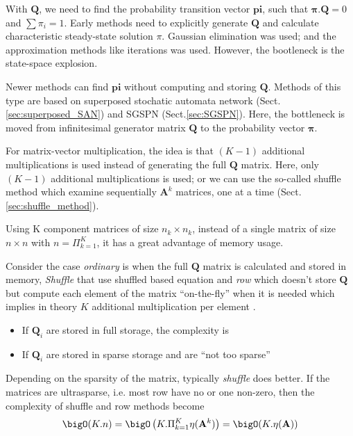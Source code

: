With $\mathbf{Q}$, we need to find the probability transition vector
$\mathbf{pi}$, such that $\mathbf{\pi.Q} = 0$ and $\sum \pi_i = 1$. Early
methods need to explicitly generate $\mathbf{Q}$ and calculate characteristic
steady-state solution $\pi$. Gaussian elimination was used; and the
approximation methods like iterations was used. However, the bootleneck is the
state-space explosion. 

Newer methods can find $\mathbf{pi}$ without computing and storing $\mathbf{Q}$.
Methods of this type are based on superposed stochatic automata network
(Sect.\ref{sec:superposed_SAN}) and SGSPN (Sect.\ref{sec:SGSPN}). Here, the
bottleneck is moved from infinitesimal generator matrix $\mathbf{Q}$ to the
probability vector $\mathbf{\pi}$. 

For matrix-vector multiplication, the idea is that $(K-1)$ additional
multiplications is used instead of generating the full $\mathbf{Q}$ matrix.
Here, only $(K-1)$ additional multiplications is used; or we can use the
so-called
    {shuffle method} which examine sequentially $\mathbf{A}^k$ matrices, one at
    a time \citep{davio1981} (Sect.\ref{sec:shuffle_method}). 

\begin{framed}
Using K component matrices of size $n_k\times n_k$, instead of a single matrix
of size $n\times n$ with $n=\Pi_{k=1}^K$, it has a great advantage of memory
usage. 

Consider the case {\it ordinary} is when the full $\mathbf{Q}$ matrix is
calculated and stored in memory, {\it Shuffle} that use shuffled based equation
and {\it row} which doesn't store $\mathbf{Q}$ but compute each element of the
matrix ``on-the-fly'' when it is needed which implies in theory $K$ additional
multiplication per element \citep{donatelli2001}. 
\begin{itemize}
  \item If $\mathbf{Q}_i$ are stored in full storage, the complexity is
  \item If $\mathbf{Q}_i$ are stored in sparse storage and are ``not too sparse''
  
\end{itemize}
Depending on the sparsity of the matrix, typically {\it shuffle} does better. If
the matrices are ultrasparse, i.e. most row have no or one non-zero, then the
complexity of shuffle and row methods become
\begin{equation}
\bigO(K.n) = \bigO\left( K.\Pi_{k=1}^K\eta(\mathbf{A}^k) \right) = \bigO
(K.\eta(\mathbf{A}))
\end{equation}
\end{framed}
	


